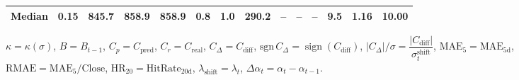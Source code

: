 \begin{threeparttable}
{\begin{tabular}{lrrrrrrrrrrrrr}
 Median &     0.15 & 845.7 &  858.9 & 858.9 &        0.8 &                      1.0 &               290.2 &         -- &        -- &             -- &              9.5 &            1.16 &                  10.00 \\
\bottomrule
\end{tabular}
}
\begin{tablenotes}\footnotesize
\item $\kappa=\kappa(\sigma)$, $B=B_{t-1}$, $C_p=C_{\text{pred}}$, $C_r=C_{\text{real}}$, $C_\Delta=C_{\text{diff}}$, $\mathrm{sgn}\,C_\Delta=\operatorname{sign}(C_{\text{diff}})$, $|C_\Delta|/\sigma=\dfrac{|C_{\text{diff}}|}{\sigma_t^{\text{shift}}}$, $\mathrm{MAE}_5=\mathrm{MAE}_{5\text{d}}$, $\mathrm{RMAE}= \mathrm{MAE}_5 / \text{Close}$, $\mathrm{HR}_{20}=\mathrm{HitRate}_{20\text{d}}$, 
$\lambda_{\text{shift}}=\lambda_t$, 
$\Delta\alpha_t=\alpha_t-\alpha_{t-1}$.
\end{tablenotes}
\end{threeparttable}
\endgroup
